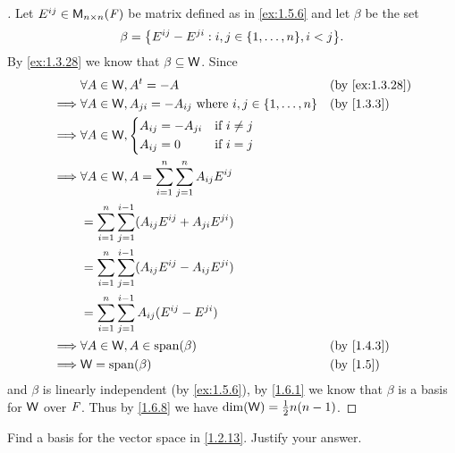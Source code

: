 \begin{proof}[]
	Let \(E^{i j} \in \mathsf{M}_{{n} \times n}({\mathit{F}})\) be matrix defined as in \cref{ex:1.5.6} and let \(\beta\) be the set
	\[
		\beta = \set{E^{i j} - E^{j i} : i, j \in \set{1, \dots, n}, i < j}.
	\]
	By \cref{ex:1.3.28} we know that \(\beta \subseteq \mathsf{W}\).
	Since
	\begin{align*}
		         & \forall A \in \W, \tp{A} = -A                                                  &  & \by{ex:1.3.28} \\
		\implies & \forall A \in \W, A_{j i} = -A_{i j} \text{ where } i, j \in \set{1, \dots, n} &  & \by{1.3.3}     \\
		\implies & \forall A \in \W, \begin{dcases}
			                             A_{i j} = -A_{j i} & \text{if } i \neq j \\
			                             A_{i j} = 0        & \text{if } i = j
		                             \end{dcases}                                         \\
		\implies & \forall A \in \W, A = \sum_{i = 1}^n \sum_{j = 1}^n A_{i j} E^{i j}                                \\
		         & = \sum_{i = 1}^n \sum_{j = 1}^{i - 1} (A_{i j} E^{i j} + A_{j i} E^{j i})                          \\
		         & = \sum_{i = 1}^n \sum_{j = 1}^{i - 1} (A_{i j} E^{i j} - A_{i j} E^{j i})                          \\
		         & = \sum_{i = 1}^n \sum_{j = 1}^{i - 1} A_{i j} (E^{i j} - E^{j i})                                  \\
		\implies & \forall A \in \W, A \in \spn{\beta}                                            &  & \by{1.4.3}     \\
		\implies & \W = \spn{\beta}                                                               &  & \by{1.5}
	\end{align*}
	and \(\beta\) is linearly independent (by \cref{ex:1.5.6}), by \cref{1.6.1} we know that \(\beta\) is a basis for \(\mathsf{W}\) over \(\mathit{F}\).
	Thus by \cref{1.6.8} we have \(\dim(\mathsf{W}) = \frac{1}{2} n(n - 1)\).
\end{proof}

\begin{ex}\label{ex:1.6.18}
	Find a basis for the vector space in \cref{1.2.13}.
	Justify your answer.
\end{ex}

